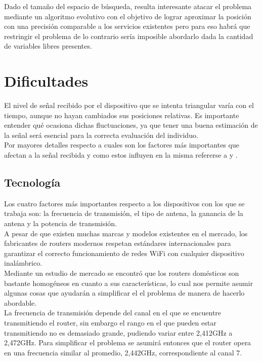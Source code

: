 \documentclass[journal]{IEEEtran}
\begin{document}
Dado el tamaño del espacio de búsqueda, resulta interesante atacar el problema mediante un algoritmo evolutivo con el objetivo de lograr aproximar la posición con una precisión comparable a los servicios existentes pero para eso habrá que restringir el problema de lo contrario sería imposible abordarlo dada la cantidad de variables libres presentes.\\

\section{Dificultades}

El nivel de señal recibido por el dispositivo que se intenta triangular varía con el tiempo, aunque no hayan cambiados sus posiciones relativas. Es importante entender qué ocasiona dichas fluctuaciones, ya que tener una buena estimación de la señal será esencial para la correcta evaluación del individuo.\\

Por mayores detalles respecto a cuales son los factores más importantes que afectan a la señal recibida y como estos influyen en la misma refererse a \cite{fuzzy:logic:based:system} y \cite{radar:tracking:system}.\\

\subsection{Tecnología}

Los cuatro factores más importantes respecto a los dispositivos con los que se trabaja son: la frecuencia de transmisión, el tipo de antena, la ganancia de la antena y la potencia de transmisión.\\

A pesar de que existen muchas marcas y modelos existentes en el mercado, los fabricantes de routers modernos respetan estándares internacionales para garantizar el correcto funcionamiento de redes WiFi con cualquier dispositivo inalámbrico.\\

Mediante un estudio de mercado se encontró que los routers domésticos son bastante homogéneos en cuanto a sus características, lo cual nos permite asumir algunas cosas que ayudarán a simplificar el el problema de manera de hacerlo abordable.\\

La frecuencia de transmisión depende del canal en el que se encuentre transmitiendo el router, sin embargo el rango en el que pueden estar transmitiendo no es demasiado grande, pudiendo variar entre 2,412GHz a 2,472GHz. Para simplificar el problema se asumirá entonces que el router opera en una frecuencia similar al promedio, 2,442GHz, correspondiente al canal 7.\\
\end{document}
